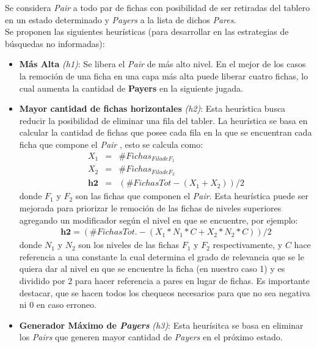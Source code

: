 \documentclass{sig-alternate}
\begin{document}
	Se considera \textit{Pair} a todo par de fichas con posibilidad de ser retiradas del tablero en un estado determinado y \textit{Payers} a la lista de dichos \textit{Pares}. \\
	Se proponen las siguientes heur\'isticas (para desarrollar en las estrategias de b\'usquedas no informadas):
	\begin{itemize}

		\item \textbf{M\'as Alta} \textit{(h1)}: Se libera el \textit{Pair} de m\'as alto nivel. En el mejor de los casos la remoci\'on de una ficha en una capa m\'as alta puede liberar cuatro fichas, lo cual aumenta la cantidad de \textbf{Payers} en la siguiente jugada.
		
		\item \textbf{Mayor cantidad de fichas horizontales} \textit{(h2)}: Esta heur\'istica busca reducir la posibilidad de eliminar una fila del tabler. La heur\'istica se basa en calcular la cantidad de fichas que posee cada fila en la que se encuentran cada ficha que compone el \textit{Pair} , esto se calcula como:
			\begin{eqnarray}
				X_{1}  & = & \# Fichas_{Fila de F_{1}} \\
				X_{2}  & = & \# Fichas_{Fila de F_{2}} \\
				\textbf{h2} & = & (\#FichasTot - ( X_{1} + X_{2} )) / 2
			\end{eqnarray}
		donde $F_{1}$ y $F_{2}$ son las fichas que componen el \textit{Pair}. Esta heur\'istica puede ser mejorada para priorizar le remoci\'on de las fichas de niveles superiores agregando un modificador seg\'un el nivel en que se encuentre, por ejemplo:
			\begin{eqnarray}
				\textbf{h2}  = (\#FichasTot. - ( X_{1} * N_{1} * C + X_{2} * N_{2} * C) )/ 2
			\end{eqnarray}
				donde $N_{1}$ y $N_{2}$ son los niveles de las fichas $F_{1}$ y $F_{2}$ respectivamente, y $C$ hace referencia a una constante la cual determina el grado de relevancia que se le quiera dar al nivel en que se encuentre la ficha (en nuestro caso 1) y es dividido por 2 para hacer referencia a pares en lugar de fichas. Es importante destacar, que se hacen todos los chequeos necesarios para que no sea negativa ni $0$ en caso erroneo.
		
		\item \textbf{Generador M\'aximo de \textit{Payers}} \textit{(h3)}: Esta heur\'isitca se basa en eliminar los \textit{Pairs} que generen mayor cantidad de \textit{Payers} en el pr\'oximo estado.
		
	\end{itemize}
	
\end{document}
